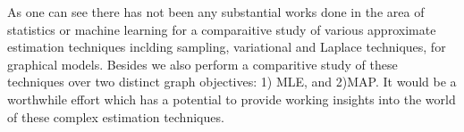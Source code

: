 As one can see there has not been any substantial works done in the area of
statistics or machine learning for a comparaitive study of various approximate
estimation techniques inclding sampling, variational and Laplace techniques, for
graphical models. Besides we also perform a comparitive study of these
techniques over two distinct graph objectives: 1) MLE, and 2)MAP. It
would be a worthwhile effort which has a potential to provide working insights
into the world of these complex estimation techniques.

